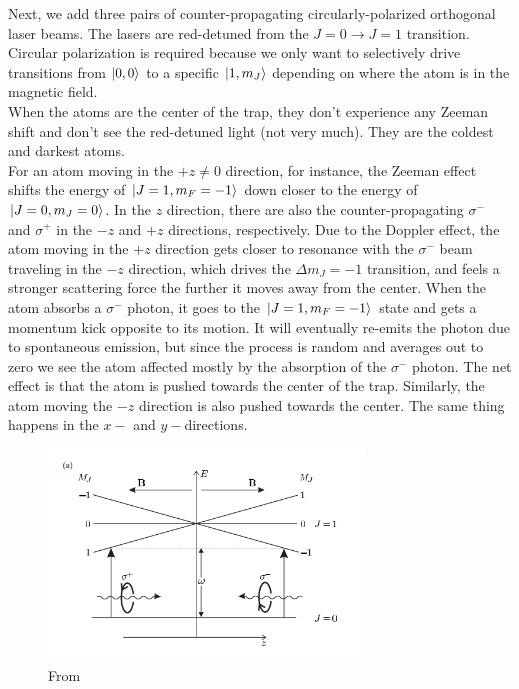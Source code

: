 \documentclass{book}
\theoremstyle{definition}
\begin{document}
Next, we add three pairs of counter-propagating circularly-polarized orthogonal laser beams. The lasers are red-detuned from the $J=0 \to J=1$ transition. Circular polarization is required because we only want to selectively drive transitions from $\ket{0,0}$ to a specific $\ket{1,m_J}$ depending on where the atom is in the magnetic field. \\


When the atoms are the center of the trap, they don't experience any Zeeman shift and don't see the red-detuned light (not very much). They are the coldest and darkest atoms.\\


For an atom moving in the $+z \neq 0$ direction, for instance, the Zeeman effect shifts the energy of $\ket{J=1,m_F=-1}$ down closer to the energy of $\ket{J=0,m_J=0}$. In the $z$ direction, there are also the counter-propagating $\sigma^-$ and $\sigma^+$ in the $- z$ and $+z$ directions, respectively. Due to the Doppler effect, the atom moving in the $+z$ direction gets closer to resonance with the $\sigma^-$ beam traveling in the $-z$ direction, which drives the $\Delta m_J = -1$ transition, and feels a stronger scattering force the further it moves away from the center. When the atom absorbs a $\sigma^-$ photon, it goes to the $\ket{J=1,m_F=-1}$ state and gets a momentum kick opposite to its motion. It will eventually re-emits the photon due to spontaneous emission, but since the process is random and averages out to zero we see the atom affected mostly by the absorption of the $\sigma^-$ photon. The net effect is that the atom is pushed towards the center of the trap. Similarly, the atom moving the $-z$ direction is also pushed towards the center. The same thing happens in the $x-$ and $y-$directions.  
 	
 	
\begin{figure}[!htb]
	\centering
	\includegraphics[width=0.75\textwidth]{images/foot_1}
	\caption{From \cite{foot2005atomic}}
\end{figure}
\end{document}
